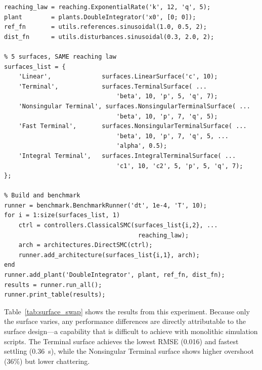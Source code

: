 \documentclass[preprint,12pt]{elsarticle}
\begin{document}
\begin{lstlisting}[style=matlab,caption={Surface swap benchmark (verbatim from \texttt{example\_surface\_swap.m}).},label=lst:swap]
% Shared components
reaching_law = reaching.ExponentialRate('k', 12, 'q', 5);
plant        = plants.DoubleIntegrator('x0', [0; 0]);
ref_fn       = utils.references.sinusoidal(1.0, 0.5, 2);
dist_fn      = utils.disturbances.sinusoidal(0.3, 2.0, 2);

% 5 surfaces, SAME reaching law
surfaces_list = {
    'Linear',              surfaces.LinearSurface('c', 10);
    'Terminal',            surfaces.TerminalSurface( ...
                               'beta', 10, 'p', 5, 'q', 7);
    'Nonsingular Terminal', surfaces.NonsingularTerminalSurface( ...
                               'beta', 10, 'p', 7, 'q', 5);
    'Fast Terminal',       surfaces.NonsingularTerminalSurface( ...
                               'beta', 10, 'p', 7, 'q', 5, ...
                               'alpha', 0.5);
    'Integral Terminal',   surfaces.IntegralTerminalSurface( ...
                               'c1', 10, 'c2', 5, 'p', 5, 'q', 7);
};

% Build and benchmark
runner = benchmark.BenchmarkRunner('dt', 1e-4, 'T', 10);
for i = 1:size(surfaces_list, 1)
    ctrl = controllers.ClassicalSMC(surfaces_list{i,2}, ...
                                     reaching_law);
    arch = architectures.DirectSMC(ctrl);
    runner.add_architecture(surfaces_list{i,1}, arch);
end
runner.add_plant('DoubleIntegrator', plant, ref_fn, dist_fn);
results = runner.run_all();
runner.print_table(results);
\end{lstlisting}

Table~\ref{tab:surface_swap} shows the results from this experiment. Because only the surface varies, any performance differences are directly attributable to the surface design---a capability that is difficult to achieve with monolithic simulation scripts. The Terminal surface achieves the lowest RMSE (0.016) and fastest settling (0.36~s), while the Nonsingular Terminal surface shows higher overshoot (36\%) but lower chattering.
\end{document}
